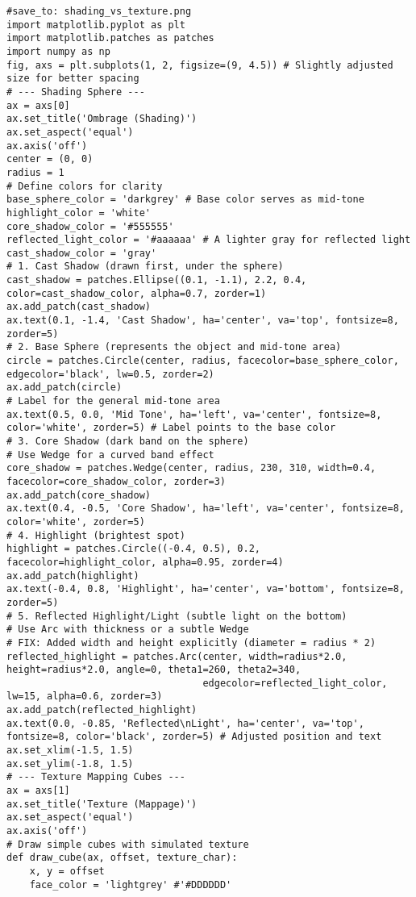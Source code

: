 \begin{verbatim}
#save_to: shading_vs_texture.png
import matplotlib.pyplot as plt
import matplotlib.patches as patches
import numpy as np
fig, axs = plt.subplots(1, 2, figsize=(9, 4.5)) # Slightly adjusted size for better spacing
# --- Shading Sphere ---
ax = axs[0]
ax.set_title('Ombrage (Shading)')
ax.set_aspect('equal')
ax.axis('off')
center = (0, 0)
radius = 1
# Define colors for clarity
base_sphere_color = 'darkgrey' # Base color serves as mid-tone
highlight_color = 'white'
core_shadow_color = '#555555'
reflected_light_color = '#aaaaaa' # A lighter gray for reflected light
cast_shadow_color = 'gray'
# 1. Cast Shadow (drawn first, under the sphere)
cast_shadow = patches.Ellipse((0.1, -1.1), 2.2, 0.4, color=cast_shadow_color, alpha=0.7, zorder=1)
ax.add_patch(cast_shadow)
ax.text(0.1, -1.4, 'Cast Shadow', ha='center', va='top', fontsize=8, zorder=5)
# 2. Base Sphere (represents the object and mid-tone area)
circle = patches.Circle(center, radius, facecolor=base_sphere_color, edgecolor='black', lw=0.5, zorder=2)
ax.add_patch(circle)
# Label for the general mid-tone area
ax.text(0.5, 0.0, 'Mid Tone', ha='left', va='center', fontsize=8, color='white', zorder=5) # Label points to the base color
# 3. Core Shadow (dark band on the sphere)
# Use Wedge for a curved band effect
core_shadow = patches.Wedge(center, radius, 230, 310, width=0.4, facecolor=core_shadow_color, zorder=3)
ax.add_patch(core_shadow)
ax.text(0.4, -0.5, 'Core Shadow', ha='left', va='center', fontsize=8, color='white', zorder=5)
# 4. Highlight (brightest spot)
highlight = patches.Circle((-0.4, 0.5), 0.2, facecolor=highlight_color, alpha=0.95, zorder=4)
ax.add_patch(highlight)
ax.text(-0.4, 0.8, 'Highlight', ha='center', va='bottom', fontsize=8, zorder=5)
# 5. Reflected Highlight/Light (subtle light on the bottom)
# Use Arc with thickness or a subtle Wedge
# FIX: Added width and height explicitly (diameter = radius * 2)
reflected_highlight = patches.Arc(center, width=radius*2.0, height=radius*2.0, angle=0, theta1=260, theta2=340,
                                  edgecolor=reflected_light_color, lw=15, alpha=0.6, zorder=3)
ax.add_patch(reflected_highlight)
ax.text(0.0, -0.85, 'Reflected\nLight', ha='center', va='top', fontsize=8, color='black', zorder=5) # Adjusted position and text
ax.set_xlim(-1.5, 1.5)
ax.set_ylim(-1.8, 1.5)
# --- Texture Mapping Cubes ---
ax = axs[1]
ax.set_title('Texture (Mappage)')
ax.set_aspect('equal')
ax.axis('off')
# Draw simple cubes with simulated texture
def draw_cube(ax, offset, texture_char):
    x, y = offset
    face_color = 'lightgrey' #'#DDDDDD'

\end{verbatim}
